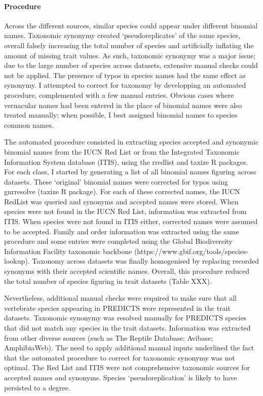 \paragraph{Procedure}
Across the different sources, similar species could appear under different binomial names. Taxonomic synonymy created `pseudoreplicates' of the same species, overall falsely increasing the total number of species and artificially inflating the amount of missing trait values. As such, taxonomic synonymy was a major issue; due to the large number of species across datasets, extensive manual checks could not be applied. The presence of typos in species names had the same effect as synonymy. I attempted to correct for taxonomy by developping an automated procedure, complemented with a few manual entries. Obvious cases where vernacular names had been entered in the place of binomial names were also treated manually; when possible, I best assigned binomial names to species common names. 

The automated procedure consisted in extracting species accepted and synonymic binomial names from the IUCN Red List or from the Integrated Taxonomic Information System database (ITIS), using the rredlist and taxize R packages. For each class, I started by generating a list of all binomial names figuring across datasets. These `original' binomial names were corrected for typos using gnr\textunderscore resolve (taxize R package). For each of these corrected names, the IUCN RedList was queried and synonyms and accepted names were stored. When species were not found in the IUCN Red List, information was extracted from ITIS. When species were not found in ITIS either, corrected names were assumed to be accepted. Family and order information was extracted using the same procedure and some entries were completed using the Global Biodiversity Information Facility taxonomic backbone (https://www.gbif.org/tools/species-lookup). Taxonomy across datasets was finally homogenised by replacing recorded synonyms with their accepted scientific names. Overall, this procedure reduced the total number of species figuring in trait datasets (Table XXX).

Nevertheless, additional manual checks were required to make sure that all vertebrate species appearing in PREDICTS were represented in the trait datasets. Taxonomic synonymy was resolved manually for PREDICTS species that did not match any species in the trait datasets. Information was extracted from other diverse sources (such as The Reptile Database; Avibase; AmphibiaWeb). The need to apply additional manual inputs underlined the fact that the automated procedure to correct for taxonomic synonymy was not optimal. The Red List and ITIS were not comprehensive taxonomic sources for accepted names and synonyms. Species `pseudoreplication' is likely to have persisted to a degree. 

